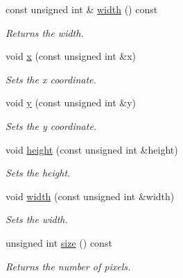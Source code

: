 \begin{CompactItemize}
const unsigned int \& \hyperlink{class_clip_location_e48a4531c0473ec63dbc992e866a50e7}{width} () const 
\begin{CompactList}\small\item\em Returns the width. \item\end{CompactList}\item 
void \hyperlink{class_clip_location_f983f4cfe6ad80aa96cbbb4b53aec968}{x} (const unsigned int \&x)
\begin{CompactList}\small\item\em Sets the x coordinate. \item\end{CompactList}\item 
void \hyperlink{class_clip_location_3c665324e5faf6bae4013d936f0ce2dc}{y} (const unsigned int \&y)
\begin{CompactList}\small\item\em Sets the y coordinate. \item\end{CompactList}\item 
void \hyperlink{class_clip_location_f0e979e989c1cecbca6fe2da92b383f7}{height} (const unsigned int \&height)
\begin{CompactList}\small\item\em Sets the height. \item\end{CompactList}\item 
void \hyperlink{class_clip_location_7dc15a35acc1594dfc1e5f64ca33d3b9}{width} (const unsigned int \&width)
\begin{CompactList}\small\item\em Sets the width. \item\end{CompactList}\item 
unsigned int \hyperlink{class_clip_location_2d01b03e23d610b26bbb2e18278cf5a8}{size} () const 
\begin{CompactList}\small\item\em Returns the number of pixels. \item\end{CompactList}\end{CompactItemize}
